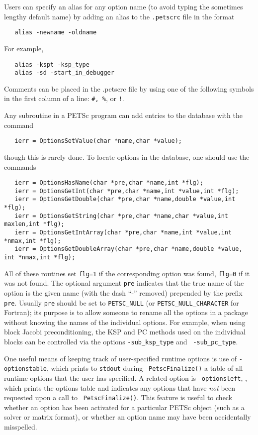 Users can specify an alias for any option name (to avoid typing the 
sometimes lengthy default name) by adding an alias to the 
{\tt .petscrc}  file in the format
 
\begin{verbatim}
   alias -newname -oldname
\end{verbatim}
For example,
\begin{verbatim}
   alias -kspt -ksp_type
   alias -sd -start_in_debugger
\end{verbatim}
Comments can be placed in the .petscrc file by using one of the
following symbols in the first column of a line: {\tt \#, \%}, or {\tt !}.

Any subroutine in a PETSc program can add entries to the database with the 
command 
\begin{verbatim}
   ierr = OptionsSetValue(char *name,char *value);
\end{verbatim}
though this is rarely done.
To locate options in the database, one should use the
commands  
\begin{verbatim}
   ierr = OptionsHasName(char *pre,char *name,int *flg);
   ierr = OptionsGetInt(char *pre,char *name,int *value,int *flg);
   ierr = OptionsGetDouble(char *pre,char *name,double *value,int *flg);
   ierr = OptionsGetString(char *pre,char *name,char *value,int maxlen,int *flg);
   ierr = OptionsGetIntArray(char *pre,char *name,int *value,int *nmax,int *flg);
   ierr = OptionsGetDoubleArray(char *pre,char *name,double *value, int *nmax,int *flg);
\end{verbatim}
All 
of  
these 
routines set {\tt flg=1} if the corresponding option was found, {\tt flg=0} if it
was not found.  The optional argument
{\tt pre} indicates that the true name of the option is the given name
(with the dash ``-'' removed) prepended by the prefix {\tt pre}.
Usually {\tt pre} should be set to {\tt PETSC\_NULL} (or {\tt PETSC\_NULL\_CHARACTER}
for Fortran); its purpose is to
allow someone to rename all the options in a package without knowing
the names of the individual options.  For example, when using block
Jacobi preconditioning, the KSP and PC methods used on the individual
blocks can be controlled via the options {\tt -sub\_ksp\_type} and {\tt
-sub\_pc\_type}. 

One useful means of keeping track of user-specified runtime options is
use of {\tt -optionstable}, which prints to {\tt stdout} during {\tt
PetscFinalize()} a table of all runtime options that the user has
specified.   A related option is {\tt -optionsleft},
, which prints the options table and indicates
any options that have {\em not} been requested upon a call to {\tt
PetscFinalize()}.  This feature is useful to check whether an option
has been activated for a particular PETSc object (such as a solver or
matrix format), or whether an option name may have been accidentally
misspelled.


